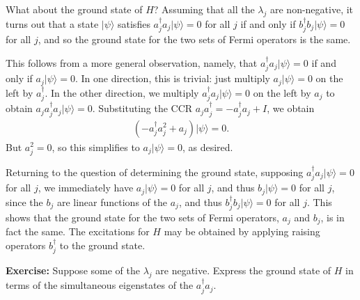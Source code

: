 \documentclass[12pt]{article}
\begin{document}
{What about the ground state of $H$?  Assuming that all the $\lambda_j$
are non-negative, it turns out that a state $|\psi\rangle$ satisfies
$a_j^\dagger a_j |\psi\rangle = 0$ for all $j$ if and only if
$b_j^\dagger b_j|\psi\rangle = 0$ for all $j$, and so the ground state
for the two sets of Fermi operators is the same.


This follows from a more general observation, namely, that
$a_j^\dagger a_j |\psi\rangle = 0$ if and only if $a_j|\psi\rangle =
0$.  In one direction, this is trivial: just multiply $a_j|\psi\rangle
= 0$ on the left by $a_j^\dagger$.  In the other direction, we
multiply $a_j^\dagger a_j |\psi\rangle = 0$ on the left by $a_j$ to
obtain $a_j a_j^\dagger a_j |\psi\rangle = 0$.  Substituting the CCR
$a_j a_j^\dagger = -a_j^\dagger a_j + I$, we obtain
\begin{eqnarray}
  (-a_j^\dagger a_j^2+a_j)|\psi\rangle = 0.
\end{eqnarray}
But $a_j^2 = 0$, so this simplifies to $a_j|\psi\rangle = 0$, as
desired.

Returning to the question of determining the ground state, supposing
$a_j^\dagger a_j|\psi\rangle = 0$ for all $j$, we immediately have
$a_j|\psi\rangle = 0$ for all $j$, and thus $b_j|\psi\rangle = 0$ for
all $j$, since the $b_j$ are linear functions of the $a_j$, and thus
$b_j^\dagger b_j|\psi\rangle = 0$ for all $j$.  This shows that the
ground state for the two sets of Fermi operators, $a_j$ and $b_j$, is
in fact the same.  The excitations for $H$ may be obtained by applying
raising operators $b_j^\dagger$ to the ground state.

\textbf{Exercise:} Suppose some of the $\lambda_j$ are negative.
Express the ground state of $H$ in terms of the simultaneous
eigenstates of the $a_j^\dagger a_j$.




}
\end{document}
